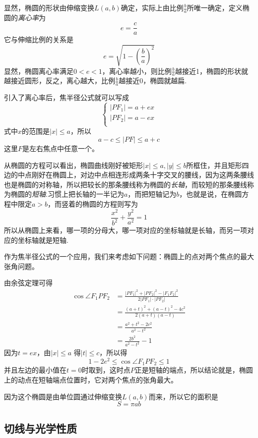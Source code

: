   显然，椭圆的形状由伸缩变换$L(a,b)$确定，实际上由比例$\frac{b}{a}$所唯一确定，定义椭圆的\emph{离心率}为
  \[ e = \frac{c}{a} \]
  它与伸缩比例的关系是
  \[ e = \sqrt{1-\left( \frac{b}{a} \right)^2} \]
  显然，椭圆离心率满足$0<e<1$，离心率越小，则比例$\frac{b}{a}$越接近1，椭圆的形状就越接近圆形，反之，离心越大，比例$\frac{b}{a}$越接近0，椭圆就越扁.

  引入了离心率后，焦半径公式就可以写成
  \[
  \begin{cases}
    |PF_1| = a + e x \\
    |PF_2| = a - e x \\
  \end{cases}
\]
式中$x$的范围是$|x| \leqslant a$，所以
\[ a-c \leqslant |PF| \leqslant a+c \]
这里$F$是左右焦点中任意一个。

从椭圆的方程可以看出，椭圆曲线刚好被矩形$|x| \leqslant a, |y| \leqslant b$所框住，并且矩形四边的中点刚好在椭圆上，对边中点相连形成两条十字交叉的腰线，因为这两条腰线也是椭圆的对称轴，所以把较长的那条腰线称为椭圆的\emph{长轴}，而较短的那条腰线称为椭圆的\emph{短轴}.习惯上把长轴的一半记为$a$，而把短轴记为$b$，也就是说，在椭圆方程中限定$a>b$，而竖着的椭圆的方程则写为
\[ \frac{x^2}{b^2} + \frac{y^2}{a^2} = 1 \]
所以从椭圆上来看，哪一项的分母大，哪一项对应的坐标轴就是长轴，而另一项对应的坐标轴就是短轴.

\begin{example}
  作为焦半径公式的一个应用，我们来考虑如下问题：椭圆上的点对两个焦点的最大张角问题。

  由余弦定理可得
  \begin{align*}
    \cos{\angle{F_1PF_2}} & = \frac{|PF_1|^2+|PF_2|^2-|F_1F_2|^2}{2|PF_1| \cdot |PF_2|} \\
                          & = \frac{(a+t)^2+(a-t)^2-4c^2}{2(a+t)(a-t)} \\
                          & = \frac{a^2+t^2-2c^2}{a^2-t^2} \\
    & = \frac{2b^2}{a^2-t^2} - 1 
  \end{align*}
  因为$t=ex$，由$|x| \leqslant a$ 得$|t| \leqslant c$，所以得
  \[ 1-2e^2 \leqslant \cos{\angle{F_1PF_2}} \leqslant 1 \]
  并且左边的最小值在$t=0$时取到，这时点$P$正是短轴的端点，所以结论就是，椭圆上的动点在短轴端点位置时，它对两个焦点的张角最大。
\end{example}
  

  因为这个椭圆是由单位圆通过伸缩变换$L(a,b)$而来，所以它的面积是
  \[ S = \pi a b \]

\subsection{切线与光学性质}
\label{sec:tangent-line-and-light-perproties}



